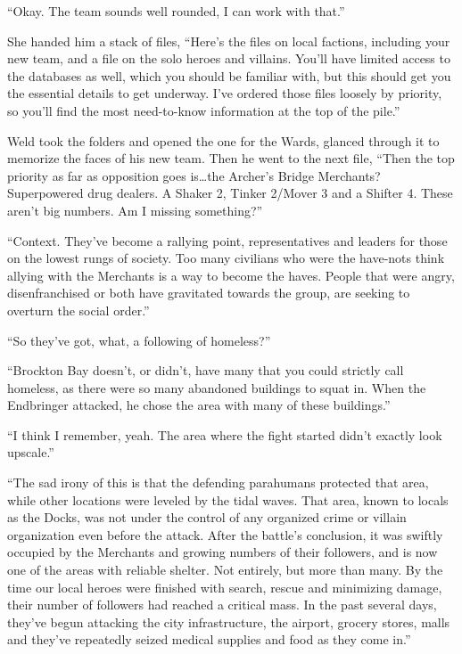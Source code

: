 ``Okay.  The team sounds well rounded, I can work with that.''



She handed him a stack of files, ``Here's the files on local factions, including your new team, and a file on the solo heroes and villains.  You'll have limited access to the databases as well, which you should be familiar with, but this should get you the essential details to get underway.  I've ordered those files loosely by priority, so you'll find the most need-to-know information at the top of the pile.''



Weld took the folders and opened the one for the Wards, glanced through it to memorize the faces of his new team.  Then he went to the next file, ``Then the top priority as far as opposition goes is\ldots the Archer's Bridge Merchants?  Superpowered drug dealers.  A Shaker 2, Tinker 2/Mover 3 and a Shifter 4.  These aren't big numbers.  Am I missing something?''



``Context.  They've become a rallying point, representatives and leaders for those on the lowest rungs of society.  Too many civilians who were the have-nots think allying with the Merchants is a way to become the haves.  People that were angry, disenfranchised or both have gravitated towards the group, are seeking to overturn the social order.''



``So they've got, what, a following of homeless?''



``Brockton Bay doesn't, or didn't,  have many that you could strictly call homeless, as there were so many abandoned buildings to squat in.  When the Endbringer attacked, he chose the area with many of these buildings.''



``I think I remember, yeah.  The area where the fight started didn't exactly look upscale.''



``The sad irony of this is that the defending parahumans protected that area, while other locations were leveled by the tidal waves.  That area, known to locals as the Docks, was not under the control of any organized crime or villain organization even before the attack.  After the battle's conclusion, it was swiftly occupied by the Merchants and growing numbers of their followers, and is now one of the areas with reliable shelter.  Not entirely, but more than many.  By the time our local heroes were finished with search, rescue and minimizing damage, their number of followers had reached a critical mass.  In the past several days, they've begun attacking the city infrastructure, the airport, grocery stores, malls and they've repeatedly seized medical supplies and food as they come in.''



